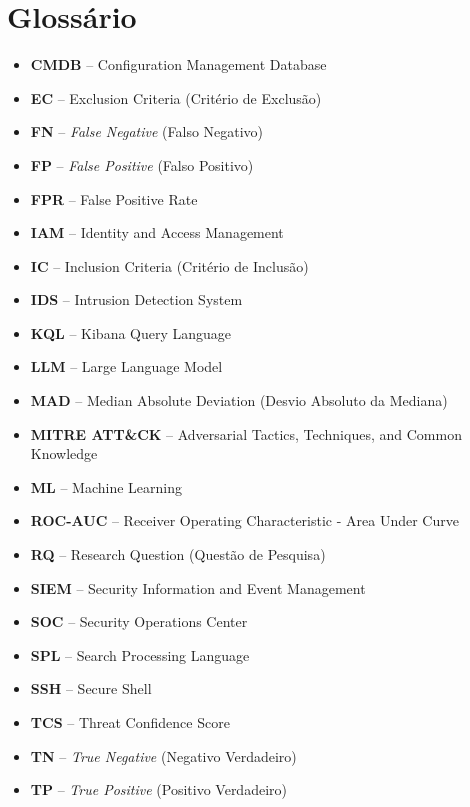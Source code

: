 \documentclass[12pt,a4paper]{article}
\begin{document}
\section*{Glossário}
\begin{itemize}
    \item \textbf{CMDB} -- Configuration Management Database
    \item \textbf{EC} -- Exclusion Criteria (Critério de Exclusão)
    \item \textbf{FN} -- \textit{False Negative} (Falso Negativo)
    \item \textbf{FP} -- \textit{False Positive} (Falso Positivo)
    \item \textbf{FPR} -- False Positive Rate
    \item \textbf{IAM} -- Identity and Access Management
    \item \textbf{IC} -- Inclusion Criteria (Critério de Inclusão)
    \item \textbf{IDS} -- Intrusion Detection System
    \item \textbf{KQL} -- Kibana Query Language
    \item \textbf{LLM} -- Large Language Model
    \item \textbf{MAD} -- Median Absolute Deviation (Desvio Absoluto da Mediana)
    \item \textbf{MITRE ATT\&CK} -- Adversarial Tactics, Techniques, and Common Knowledge
    \item \textbf{ML} -- Machine Learning
    \item \textbf{ROC-AUC} -- Receiver Operating Characteristic - Area Under Curve
    \item \textbf{RQ} -- Research Question (Questão de Pesquisa)
    \item \textbf{SIEM} -- Security Information and Event Management
    \item \textbf{SOC} -- Security Operations Center
    \item \textbf{SPL} -- Search Processing Language
    \item \textbf{SSH} -- Secure Shell
    \item \textbf{TCS} -- Threat Confidence Score
    \item \textbf{TN} -- \textit{True Negative} (Negativo Verdadeiro)
    \item \textbf{TP} -- \textit{True Positive} (Positivo Verdadeiro)
\end{itemize}

\newpage
\end{document}
